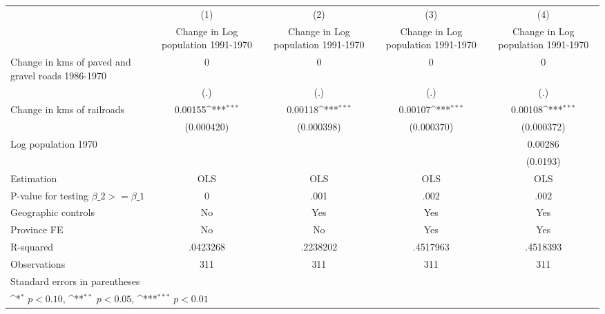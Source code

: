 {
\def\sym#1{\ifmmode^{#1}\else\(^{#1}\)\fi}
\begin{tabular}{l*{4}{c}}
\hline\hline
                    &\multicolumn{1}{c}{(1)}&\multicolumn{1}{c}{(2)}&\multicolumn{1}{c}{(3)}&\multicolumn{1}{c}{(4)}\\
                    &\multicolumn{1}{c}{Change in Log population 1991-1970}&\multicolumn{1}{c}{Change in Log population 1991-1970}&\multicolumn{1}{c}{Change in Log population 1991-1970}&\multicolumn{1}{c}{Change in Log population 1991-1970}\\
\hline
Change in kms of paved and gravel roads 1986-1970&           0         &           0         &           0         &           0         \\
                    &         (.)         &         (.)         &         (.)         &         (.)         \\
[1em]
Change in kms of railroads&     0.00155\sym{***}&     0.00118\sym{***}&     0.00107\sym{***}&     0.00108\sym{***}\\
                    &  (0.000420)         &  (0.000398)         &  (0.000370)         &  (0.000372)         \\
[1em]
Log population 1970 &                     &                     &                     &     0.00286         \\
                    &                     &                     &                     &    (0.0193)         \\
\hline
Estimation          &         OLS         &         OLS         &         OLS         &         OLS         \\
P-value for testing $\beta\_2 >= \beta\_1$&           0         &        .001         &        .002         &        .002         \\
Geographic controls &          No         &         Yes         &         Yes         &         Yes         \\
Province FE         &          No         &          No         &         Yes         &         Yes         \\
R-squared           &    .0423268         &    .2238202         &    .4517963         &    .4518393         \\
Observations        &         311         &         311         &         311         &         311         \\
\hline\hline
\multicolumn{5}{l}{\footnotesize Standard errors in parentheses}\\
\multicolumn{5}{l}{\footnotesize \sym{*} \(p<0.10\), \sym{**} \(p<0.05\), \sym{***} \(p<0.01\)}\\
\end{tabular}
}
